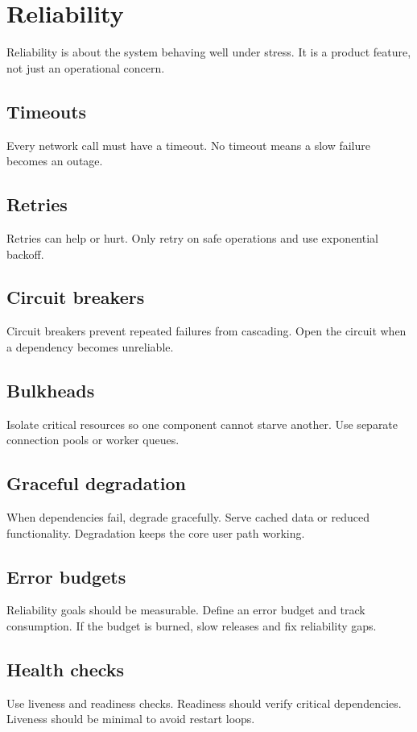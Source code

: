 \chapter{Reliability}

Reliability is about the system behaving well under stress.
It is a product feature, not just an operational concern.

\section{Timeouts}
Every network call must have a timeout.
No timeout means a slow failure becomes an outage.

\section{Retries}
Retries can help or hurt.
Only retry on safe operations and use exponential backoff.

\section{Circuit breakers}
Circuit breakers prevent repeated failures from cascading.
Open the circuit when a dependency becomes unreliable.

\section{Bulkheads}
Isolate critical resources so one component cannot starve another.
Use separate connection pools or worker queues.

\section{Graceful degradation}
When dependencies fail, degrade gracefully.
Serve cached data or reduced functionality.
Degradation keeps the core user path working.

\section{Error budgets}
Reliability goals should be measurable.
Define an error budget and track consumption.
If the budget is burned, slow releases and fix reliability gaps.

\section{Health checks}
Use liveness and readiness checks.
Readiness should verify critical dependencies.
Liveness should be minimal to avoid restart loops.

